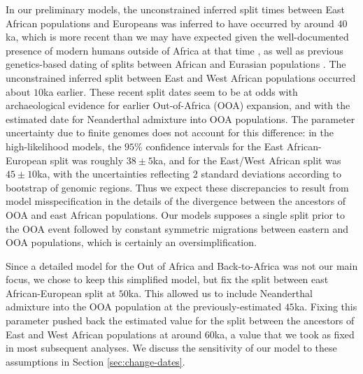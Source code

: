 \documentclass[]{article}
\newcommand{\sgcomment}[1]{{\textcolor{red}{SG: #1}}}
\begin{document}
In our preliminary models, the unconstrained inferred split times between East
African populations and Europeans was inferred to have occurred by around
$40$ka, which is more recent than we may have expected given the
well-documented presence of modern humans outside of Africa at that time
\citep[e.g.]{Hublin2020-nk,Hajdinjak2021-jo}, as well as previous
genetics-based dating of splits between African and Eurasian populations
\citep[e.g.]{Jouganous2017-pq,Kamm2020-vn}. The unconstrained inferred split
between East and West African populations occurred about $10$ka earlier. These
recent split dates seem to be at odds with archaeological evidence for earlier
Out-of-Africa (OOA) expansion, and with the estimated date for Neanderthal
admixture into OOA populations. The parameter uncertainty due to finite genomes
does not account for this difference: in the high-likelihood models, the $95\%$
confidence intervals for the East African-European split was roughly $38 \pm
5$ka, and for the East/West African split was $45 \pm 10$ka, with the
uncertainties reflecting 2 standard deviations according to bootstrap of
genomic regions.  Thus we expect these discrepancies to result from model
misspecification in the details of the divergence between the ancestors of OOA
and east African populations. Our models supposes a single split prior to the
OOA event followed by constant symmetric migrations between eastern and OOA
populations, which is certainly an oversimplification. 

Since a detailed model for the Out of Africa and Back-to-Africa was not our
main focus, we chose to keep this simplified model, but fix the split between
east African-European split at $50$ka. This allowed us to include Neanderthal
admixture into the OOA population at the previously-estimated $45$ka. Fixing
this parameter pushed back the estimated value for the split between the
ancestors of East and West African populations at around $60$ka, a value that
we took as fixed in most subsequent analyses. 
We discuss the sensitivity of our model to these assumptions in Section
\ref{sec:change-dates}.

%
%
\end{document}
